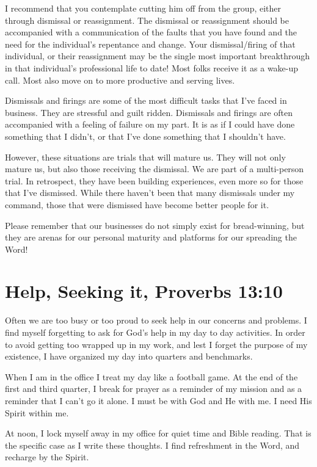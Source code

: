 \documentclass[12pt]{memoir}
\begin{document}
I recommend that you contemplate cutting him off from the group, either through dismissal or
reassignment. The dismissal or reassignment should be accompanied with a communication of the faults that you have found and the need
for the individual's repentance and change. Your dismissal\slash{}firing of that individual, or their reassignment may be the single most important breakthrough
in that individual's professional life to date! Most folks receive it as a wake-up call. Most also move on to more productive and serving lives.

Dismissals and firings are some of the most difficult tasks that I've
faced in business. They are stressful and guilt ridden. Dismissals
and firings are often accompanied with a feeling of failure on my
part. It is as if I could have done something that I didn't, or that I've done something that I shouldn't have.

However, these situations
are trials that will mature us. They will not only mature us, but also those receiving the dismissal. We are part of a multi-person
trial. In retrospect, they have been building experiences, even more so for those that I've dismissed. While there haven't been that many dismissals under my command, those that were dismissed have become better people for it. 

Please remember that our businesses do not simply exist for bread-winning, but they are arenas for our personal maturity and platforms for our spreading the Word!

\section[Help, Seeking it]{Help, Seeking it, Proverbs 13:10}

Often we are too busy or too proud to seek help in our concerns and
problems. I find myself forgetting to ask for God's help in my day
to day activities. In order to avoid getting too wrapped up in my work, and lest I forget the purpose of my existence, I have organized
my day into quarters and benchmarks. 

When I am in the office I treat my day like a football game. At the
end of the first and third quarter, I break for prayer as a reminder
of my mission and as a reminder that I can't go it alone. I must be with God and He with me. I need His Spirit within me. 

At noon, I lock myself away in my office for quiet time and Bible reading. That is the specific case as I write these thoughts.
I find refreshment in the Word, and recharge by the Spirit. 
\end{document}

